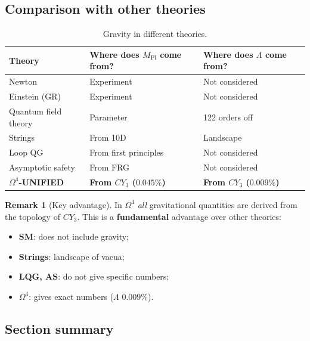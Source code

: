\documentclass[11pt,a4paper]{article}
\newcommand{\CY}{CY_3}
\newcommand{\Om}{\Omega^4}
\newcommand{\Mpl}{M_{\text{Pl}}}
\theoremstyle{definition}
\newtheorem{remark}[theorem]{Remark}
\begin{document}
\subsection{Comparison with other theories}
\label{subsec:gravity-comparison}

\begin{table}[htbp]
\centering
\caption{Gravity in different theories.}
\label{tab:gravity-comparison}
\begin{tabular}{p{3.5cm}p{5cm}p{5cm}}
\toprule
Theory & Where does $\Mpl$ come from? & Where does $\Lambda$ come from? \\
\midrule
Newton & Experiment & Not considered \\[0.3em]
Einstein (GR) & Experiment & Not considered \\[0.3em]
Quantum field theory & Parameter & 122 orders off \\[0.3em]
Strings & From 10D & Landscape \\[0.3em]
Loop QG & From first principles & Not considered \\[0.3em]
Asymptotic safety & From FRG & Not considered \\[0.3em]
\textbf{$\Om$-UNIFIED} & 
    \textbf{From $\CY$ ($0.045\%$)} & 
    \textbf{From $\CY$ ($0.009\%$)} \\
\bottomrule
\end{tabular}
\end{table}

\begin{remark}[Key advantage]
\label{rem:gravity-advantage}
In $\Om$ \emph{all} gravitational quantities are derived from the 
topology of $\CY$. This is a \textbf{fundamental} advantage 
over other theories:
\begin{itemize}
    \item \textbf{SM}: does not include gravity;
    \item \textbf{Strings}: landscape of vacua;
    \item \textbf{LQG, AS}: do not give specific numbers;
    \item \textbf{$\Om$}: gives exact numbers ($\Lambda$ $0.009\%$).
\end{itemize}
\end{remark}

\subsection{Section summary}
\label{subsec:gravity-summary}
\end{document}
